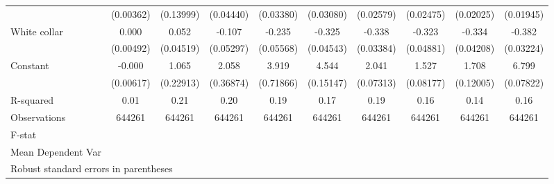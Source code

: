 {\begin{tabular}{l*{9}{c}}
                    &   (0.00362)         &   (0.13999)         &   (0.04440)         &   (0.03380)         &   (0.03080)         &   (0.02579)         &   (0.02475)         &   (0.02025)         &   (0.01945)         \\
White collar        &       0.000         &       0.052         &      -0.107\sym{*}  &      -0.235\sym{***}&      -0.325\sym{***}&      -0.338\sym{***}&      -0.323\sym{***}&      -0.334\sym{***}&      -0.382\sym{***}\\
                    &   (0.00492)         &   (0.04519)         &   (0.05297)         &   (0.05568)         &   (0.04543)         &   (0.03384)         &   (0.04881)         &   (0.04208)         &   (0.03224)         \\
Constant            &      -0.000         &       1.065\sym{***}&       2.058\sym{***}&       3.919\sym{***}&       4.544\sym{***}&       2.041\sym{***}&       1.527\sym{***}&       1.708\sym{***}&       6.799\sym{***}\\
                    &   (0.00617)         &   (0.22913)         &   (0.36874)         &   (0.71866)         &   (0.15147)         &   (0.07313)         &   (0.08177)         &   (0.12005)         &   (0.07822)         \\
\hline
R-squared           &        0.01         &        0.21         &        0.20         &        0.19         &        0.17         &        0.19         &        0.16         &        0.14         &        0.16         \\
Observations        &      644261         &      644261         &      644261         &      644261         &      644261         &      644261         &      644261         &      644261         &      644261         \\
F-stat              &                     &                     &                     &                     &                     &                     &                     &                     &                     \\
Mean Dependent Var  &                     &                     &                     &                     &                     &                     &                     &                     &                     \\
\hline\hline
\multicolumn{10}{l}{\footnotesize Robust standard errors in parentheses}\\
\end{tabular}
}
